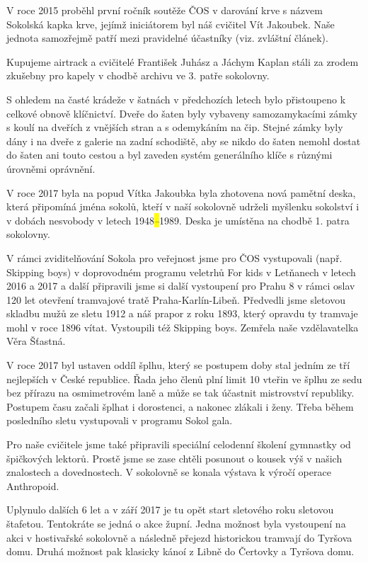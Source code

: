 V roce 2015 proběhl první ročník soutěže ČOS v darování krve s názvem
Sokolská kapka krve, jejímž iniciátorem byl náš cvičitel Vít Jakoubek.
Naše jednota samozřejmě patří mezi pravidelné účastníky (viz. zvláštní
článek).

Kupujeme airtrack a cvičitelé František Juhász a Jáchym Kaplan stáli za
zrodem zkušebny pro kapely v chodbě archivu ve 3. patře sokolovny.

S ohledem na časté krádeže v šatnách v předchozích letech bylo
přistoupeno k celkové obnově klíčnictví. Dveře do šaten byly vybaveny
samozamykacími zámky s koulí na dveřích z vnějších stran a s odemykáním
na čip. Stejné zámky byly dány i na dveře z galerie na zadní schodiště,
aby se nikdo do šaten nemohl dostat do šaten ani touto cestou a byl
zaveden systém generálního klíče s různými úrovněmi oprávnění.

V roce 2017 byla na popud Vítka Jakoubka byla zhotovena nová pamětní
deska, která připomíná jména sokolů, kteří v naší sokolovně udrželi
myšlenku sokolství i v dobách nesvobody v letech 1948\emph{\hl{--}}1989.
Deska je umístěna na chodbě 1. patra sokolovny.

V rámci zviditelňování Sokola pro veřejnost jsme pro ČOS vystupovali
(např. Skipping boys) v doprovodném programu veletrhů For kids v
Letňanech v letech 2016 a 2017 a další připravili jsme si další
vystoupení pro Prahu 8 v rámci oslav 120 let otevření tramvajové tratě
Praha-Karlín-Libeň. Předvedli jsme sletovou skladbu mužů ze sletu 1912 a
náš prapor z roku 1893, který opravdu ty tramvaje mohl v roce 1896
vítat. Vystoupili též Skipping boys. Zemřela naše vzdělavatelka Věra
Šťastná.

V roce 2017 byl ustaven oddíl šplhu, který se postupem doby stal jedním
ze tří nejlepších v České republice. Řada jeho členů plní limit 10
vteřin ve šplhu ze sedu bez přírazu na osmimetrovém laně a může se tak
účastnit mistrovství republiky. Postupem času začali šplhat i
dorostenci, a nakonec zlákali i ženy. Třeba během posledního sletu
vystupovali v programu Sokol gala.

Pro naše cvičitele jsme také připravili speciální celodenní školení
gymnastky od špičkových lektorů. Prostě jsme se zase chtěli posunout o
kousek výš v našich znalostech a dovednostech. V sokolovně se konala
výstava k výročí operace Anthropoid.

Uplynulo dalších 6 let a v září 2017 je tu opět start sletového roku
sletovou štafetou. Tentokráte se jedná o akce župní. Jedna možnost byla
vystoupení na akci v hostivařské sokolovně a následně přejezd
historickou tramvají do Tyršova domu. Druhá možnost pak klasicky kánoí z
Libně do Čertovky a Tyršova domu.

